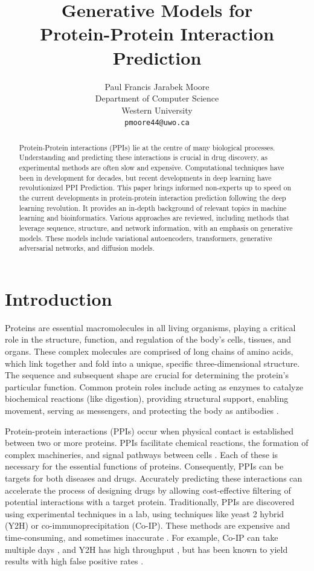 \documentclass{article}
\title{Generative Models for \\ Protein-Protein Interaction Prediction}
\author{
  Paul Francis Jarabek Moore \\
  Department of Computer Science \\
  Western University \\
  \texttt{pmoore44@uwo.ca}
}
\begin{document}
\maketitle

\begin{abstract}
Protein-Protein interactions (PPIs) lie at the centre of many biological processes. Understanding and predicting these interactions is crucial in drug discovery, as experimental methods are often slow and expensive. Computational techniques have been in development for decades, but recent developments in deep learning have revolutionized PPI Prediction. This paper brings informed non-experts up to speed on the current developments in protein-protein interaction prediction following the deep learning revolution. It provides an in-depth background of relevant topics in machine learning and bioinformatics. Various approaches are reviewed, including methods that leverage sequence, structure, and network information, with an emphasis on generative models. These models include variational autoencoders, transformers, generative adversarial networks, and diffusion models.
\end{abstract}


\section{Introduction}
Proteins are essential macromolecules in all living organisms, playing a critical role in the structure, function, and regulation of the body's cells, tissues, and organs. These complex molecules are comprised of long chains of amino acids, which link together and fold into a unique, specific three-dimensional structure. The sequence and subsequent shape are crucial for determining the protein's particular function. Common protein roles include acting as enzymes to catalyze biochemical reactions (like digestion), providing structural support, enabling movement, serving as messengers, and protecting the body as antibodies \citep{reece2011campbell}.

Protein-protein interactions (PPIs) occur when physical contact is established between two or more proteins. PPIs facilitate chemical reactions, the formation of complex machineries, and signal pathways between cells \citep{morris_uncovering_2022}. Each of these is necessary for the essential functions of proteins. Consequently, PPIs can be targets for both diseases and drugs. Accurately predicting these interactions can accelerate the process of designing drugs by allowing cost-effective filtering of potential interactions with a target protein. Traditionally, PPIs are discovered using experimental techniques in a lab, using techniques like yeast 2 hybrid (Y2H) or co-immunoprecipitation (Co-IP). These methods are expensive and time-consuming, and sometimes inaccurate \citep{ding_computational_2018}. For example, Co-IP can take multiple days \citep{tang_analysis_2018}, and Y2H has high throughput \citep{bruckner_yeast_2009}, but has been known to yield results with high false positive rates \citep{vidalain_increasing_2004}. 
\end{document}
